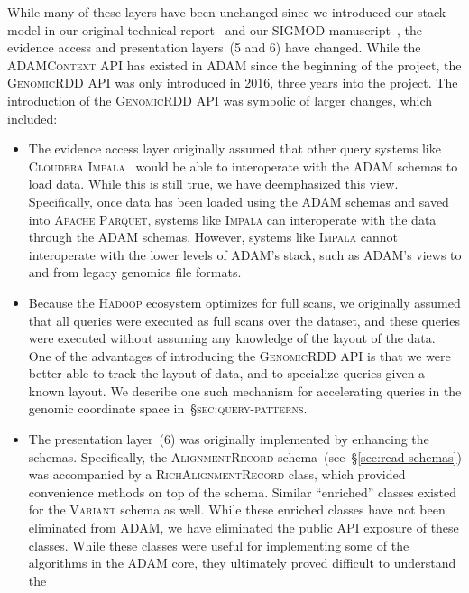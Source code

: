 \documentclass[phd]{ucbthesis}
\begin{document}
While many of these layers have been unchanged since we introduced our stack
model in our original technical report~\cite{massie13} and our SIGMOD
manuscript~\cite{nothaft15}, the evidence access and presentation layers~(5 and
6) have changed. While the \textsc{ADAMContext} API has existed in \textsc{ADAM}
since the beginning of the project, the \textsc{GenomicRDD} API was only
introduced in 2016, three years into the project. The introduction of the
\textsc{GenomicRDD} API was symbolic of larger changes, which included:

\begin{itemize}
\item The evidence access layer originally assumed that other query systems like
  \textsc{Cloudera Impala}~\cite{kornacker15} would be able to interoperate with
  the \textsc{ADAM} schemas to load data. While this is still true, we have
  deemphasized this view. Specifically, once data has been loaded using the
  \textsc{ADAM} schemas and saved into \textsc{Apache Parquet}, systems like
  \textsc{Impala} can interoperate with the data through the \textsc{ADAM}
  schemas. However, systems like \textsc{Impala} cannot interoperate with
  the lower levels of \textsc{ADAM}'s stack, such as \textsc{ADAM}'s views to
  and from legacy genomics file formats.
\item Because the \textsc{Hadoop} ecosystem optimizes for full scans, we
  originally assumed that all queries were executed as full scans over the
  dataset, and these queries were executed without assuming any knowledge of the
  layout of the data. One of the advantages of introducing the
  \textsc{GenomicRDD} API is that we were better able to track the layout of
  data, and to specialize queries given a known layout. We describe one such
  mechanism for accelerating queries in the genomic coordinate space
  in~\S\textsc{sec:query-patterns}.
\item The presentation layer~(6) was originally implemented by enhancing the
  schemas. Specifically, the \textsc{AlignmentRecord}
  schema~(see~\S\ref{sec:read-schemas}) was accompanied by a
  \textsc{RichAlignmentRecord} class, which provided convenience methods on top
  of the schema. Similar ``enriched'' classes existed for the \textsc{Variant}
  schema as well. While these enriched classes have not been eliminated from
  \textsc{ADAM}, we have eliminated the public API exposure of these classes.
  While these classes were useful for implementing some of the algorithms in the
  \textsc{ADAM} core, they ultimately proved difficult to understand the

\end{itemize}
\end{document}
